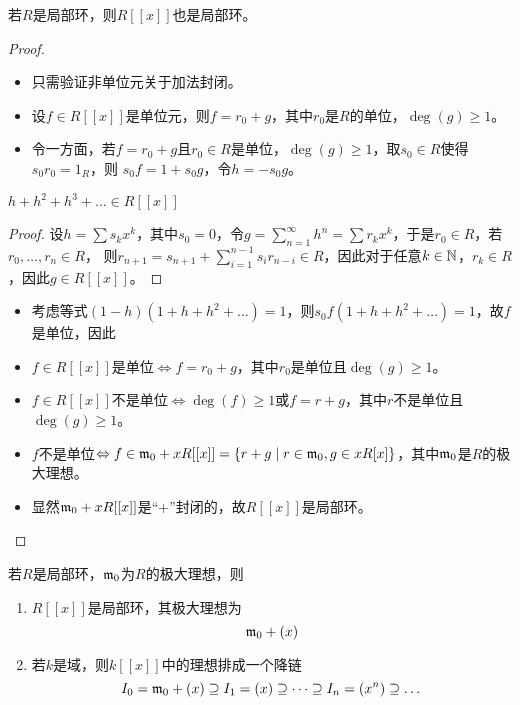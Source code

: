 \documentclass[11pt]{article}
\begin{document}
\begin{proposition}[]
若\(R\)是局部环，则\(R[[x]]\)也是局部环。
\end{proposition}

\begin{proof}
\begin{itemize}
\item 只需验证非单位元关于加法封闭。
\item 设\(f\in R[[x]]\)是单位元，则\(f=r_0+g\)，其中\(r_0\)是\(R\)的单位，\(\deg(g)\ge 1\)。
\item 令一方面，若\(f=r_0+g\)且\(r_0\in R\)是单位，\(\deg(g)\ge 1\)，取\(s_0\in R\)使得\(s_0r_0=1_R\)，则
\(s_0f=1+s_0g\)，令\(h=-s_0g\)。
\end{itemize}
\begin{claim}
\(h+h^2+h^3+\dots\in R[[x]]\)
\end{claim}

\begin{proof}
设\(h=\sum s_kx^k\)，其中\(s_0=0\)，令\(g=\sum_{n=1}^\infty h^n=\sum r_kx^k\)，于是\(r_0\in R\)，若\(r_0,\dots,r_n\in R\)，
则\(r_{n+1}=s_{n+1}+\sum_{i=1}^{n-1}s_ir_{n-i}\in R\)，因此对于任意\(k\in\mathbb{N}\)，\(r_k\in R\)，因此\(g\in R[[x]]\)。
\end{proof}
\begin{itemize}
\item 考虑等式\((1-h)(1+h+h^2+\dots)=1\)，则\(s_0f(1+h+h^2+\dots)=1\)，故\(f\)是单位，因此
\item \(f\in R[[x]]\)是单位\(\Leftrightarrow f=r_0+g\)，其中\(r_0\)是单位且\(\deg(g)\ge 1\)。
\item \(f\in R[[x]]\)不是单位\(\Leftrightarrow \deg(f)\ge 1\)或\(f=r+g\)，其中\(r\)不是单位且\(\deg(g)\ge 1\)。
\item \(f\)不是单位\(\Leftrightarrow f\in \mathfrak{m}_0+xR[[x]]=\{r+g\mid r\in\mathfrak{m}_0,g\in xR[x]\}\)，其中\(\mathfrak{m}_0\)是\(R\)的极大理想。
\item 显然\(\mathfrak{m}_0+xR[[x]]\)是“+”封闭的，故\(R[[x]]\)是局部环。
\end{itemize}
\end{proof}

\begin{corollary}[]
若\(R\)是局部环，\(\mathfrak{m}_0\)为\(R\)的极大理想，则
\begin{enumerate}
\item \(R[[x]]\)是局部环，其极大理想为
\begin{equation*}
\mathfrak{m}_0+(x)
\end{equation*}
\item 若\(k\)是域，则\(k[[x]]\)中的理想排成一个降链
\begin{equation*}
I_0=\mathfrak{m}_0+(x)\supseteq I_1=(x)\supseteq\dots\supseteq I_n=(x^n)\supseteq\dots
\end{equation*}
\end{enumerate}
\end{corollary}
\end{document}
